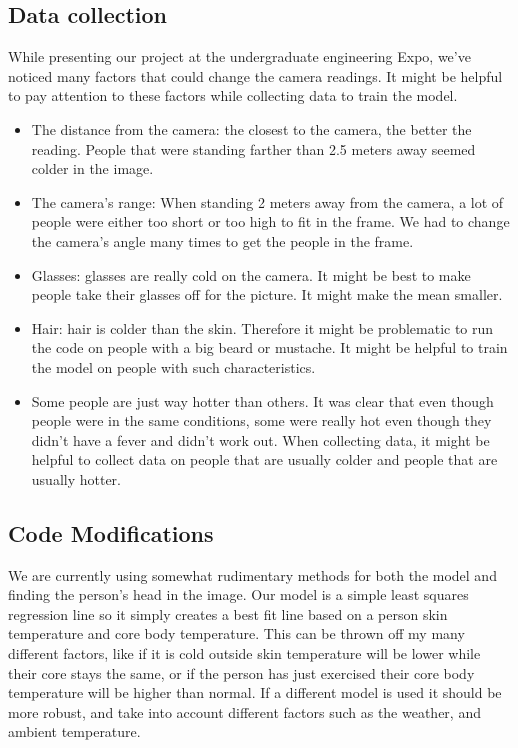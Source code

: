 \subsection*{Data collection}
	While presenting our project at the undergraduate engineering Expo, we’ve noticed many factors that could change the camera readings. It might be helpful to pay attention to these factors while collecting data to train the model.  
	\begin{itemize}
		\item The distance from the camera: the closest to the camera, the better the reading. People that were standing farther than 2.5 meters away seemed colder in the image.  
		
		\item The camera’s range: When standing 2 meters away from the camera, a lot of people were either too short or too high to fit in the frame. We had to change the camera’s angle many times to get the people in the frame.  
		
		\item Glasses: glasses are really cold on the camera. It might be best to make people take their glasses off for the picture. It might make the mean smaller.
		
		\item Hair: hair is colder than the skin. Therefore it might be problematic to run the code on people with a big beard or mustache. It might be helpful to train the model on people with such characteristics. 
		
		\item	Some people are just way hotter than others. It was clear that even though people were in the same conditions, some were really hot even though they didn’t have a fever and didn’t work out. When collecting data, it might be helpful to collect data on people that are usually colder and people that are usually hotter. 
	\end{itemize}
\subsection*{Code Modifications}
	We are currently using somewhat rudimentary methods for both the model and finding the person’s head in the image. Our model is a simple least squares regression line so it simply creates a best fit line based on a person skin temperature and core body temperature. This can be thrown off my many different factors, like if it is cold outside skin temperature will be lower while their core stays the same, or if the person has just exercised their core body temperature will be higher than normal. If a different model is used it should be more robust, and take into account different factors such as the weather, and ambient temperature.
	
